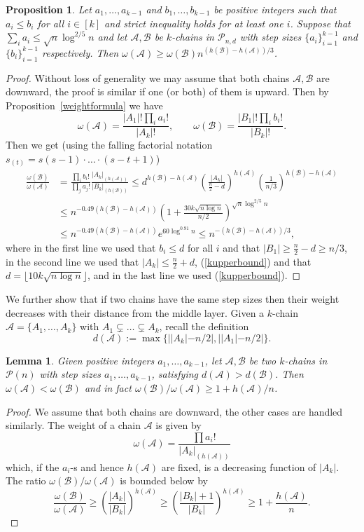 \documentclass[12pt]{article}
\newtheorem{lemma}[theorem]{Lemma}
\newtheorem{prop}[theorem]{Proposition}
\numberwithin{equation}{section}
\def\A{\mathcal{A}}
\def\B{\mathcal{B}}
\def\P{\mathcal{P}}
\def\w{\omega}
\begin{document}
\begin{prop}\label{weightsdecreasealot}
Let $a_1,\ldots,a_{k-1}$ and $b_1,\ldots,b_{k-1}$ be positive integers such that $a_i\leq b_i$ for all $i\in [k]$ and strict inequality holds for at least one $i$. Suppose that $\sum_i a_i \leq \sqrt{n}\log^{2/5}n$ and let $\A,\B$ be $k$-chains in $\P_{n,d}$ with step sizes $\{a_i\}_{i=1}^{k-1}$ and $\{b_i\}_{i=1}^{k-1}$ respectively. Then $\w(\A)\geq \w(\B) n^{(h(\B)-h(\A))/3}$.
\end{prop}
\begin{proof}
Without loss of generality we may assume that both chains $\A,\B$ are downward, the proof is similar if one (or both) of them is upward. Then by Proposition~\ref{weightformula} we have 
$$\w(\A)=\frac{|A_1|!\prod_i a_i!}{|A_k|!}, \qquad \w(\B)=\frac{|B_1|! \prod_i b_i!}{|B_k|!}.$$
Then we get (using the falling factorial notation $s_{(t)}=s(s-1)\cdot\ldots\cdot (s-t+1)$)
\begin{equation*}
\begin{split}
\frac{\w(\B)}{\w(\A)}&=\frac{\prod_i b_i!}{\prod_j a_j!}\frac{|A_k|_{(h(\A))}}{|B_k|_{(h(\B))}}\leq 
d^{h(\B)-h(\A)}\left(\frac{|A_k|}{\frac{n}{2}-d}\right)^{h(\A)}\left(\frac{1}{n/3}\right)^{h(\B)-h(\A)}\\
&\leq n^{-0.49(h(\B)-h(\A))} \left(1+\frac{30k\sqrt{n\log n}}{n/2}\right)^{\sqrt{n}\log^{2/5 }n} 
\\&\leq n^{-0.49(h(\B)-h(\A))} e^{60\log^{0.91}n}\leq n^{-(h(\B)-h(\A))/3},
\end{split}
\end{equation*}
where in the first line we used that $b_i\leq d$ for all $i$ and that $|B_1|\geq \frac{n}{2}-d\geq n/3$, in the second line we used that $|A_k|\leq \frac{n}{2}+d$, (\ref{kupperbound}) and that $d=\lfloor 10k\sqrt{n\log n}\rfloor$, and in the last line we used  (\ref{kupperbound}).
\end{proof}

We further show that if two chains have the same step sizes then their weight decreases with their distance from the middle layer. Given a $k$-chain $\A=\{A_1,\ldots,A_k\}$ with $A_1\subsetneq\ldots\subsetneq A_k$, recall the definition
$$d(\A):=\max\{||A_k|-n/2|, ||A_1|-n/2|\}.$$

\begin{lemma}\label{weightsdecreaselittle}
Given positive integers $a_1,\ldots,a_{k-1}$, let $\A,\B$ be two $k$-chains in $\P(n)$ with step sizes $a_1,\ldots, a_{k-1}$, satisfying $d(\A)>d(\B)$. Then $\w(\A)<\w(\B)$ and in fact $\w(\B)/\w(\A)\geq 1+h(\A)/n$.
\end{lemma}
\begin{proof}
We assume that both chains are downward, the other cases are handled similarly. The weight of a chain $\A$ is given by 
$$\w(\A)=\frac{\prod a_i!}{|A_k|_{(h(\A))}}$$ which, if the $a_i$-s and hence $h(\A)$ are fixed, is a decreasing function of $|A_k|$. The ratio $\w(\B)/\w(\A)$ is bounded below by
$$\frac{\w(\B)}{\w(\A)}\geq \left(\frac{|A_k|}{|B_k|}\right)^{h(\A)}\geq \left(\frac{|B_k|+1}{|B_k|}\right)^{h(\A)}\geq 1+\frac{h(\A)}{n}.$$
\end{proof}
\end{document}
